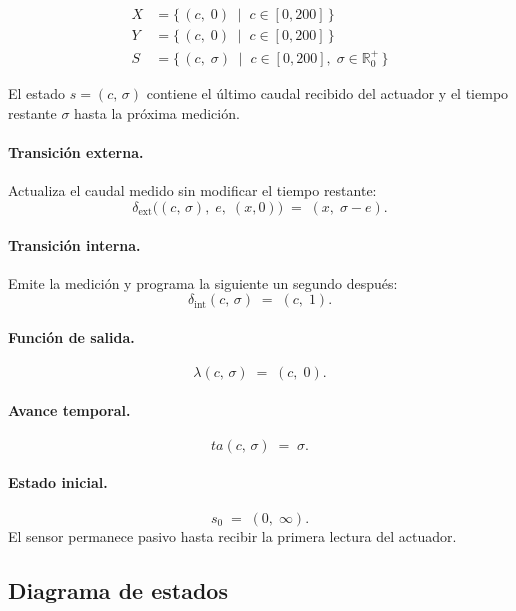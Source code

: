 \documentclass{article}
\newcommand{\dint}{\delta_{\mathrm{int}}}
\newcommand{\dext}{\delta_{\mathrm{ext}}}
\newcommand{\ta}{\mathit{ta}}
\begin{document}
\begin{align*}
  X &= \{\,(c,\;0)\;\mid\; c\in[0,200]\,\} \\[4pt]
  Y &= \{\,(c,\;0)\;\mid\; c\in[0,200]\,\} \\[4pt]
  S &= \{\,(c,\;\sigma)\;\mid\; c\in[0,200],\;\sigma\in\mathbb{R}_0^{+}\,\}
\end{align*}

El estado $s = (c,\,\sigma)$ contiene el último caudal recibido del
actuador y el tiempo restante $\sigma$ hasta la próxima medición.

\paragraph{Transición externa.}
Actualiza el caudal medido sin modificar el tiempo restante:
\[
  \dext\bigl((c,\,\sigma),\;e,\;(x,0)\bigr)
  \;=\; (x,\;\sigma - e).
\]

\paragraph{Transición interna.}
Emite la medición y programa la siguiente un segundo después:
\[
  \dint(c,\,\sigma) \;=\; (c,\;1).
\]

\paragraph{Función de salida.}
\[
  \lambda(c,\,\sigma) \;=\; (c,\;0).
\]

\paragraph{Avance temporal.}
\[
  \ta(c,\,\sigma) \;=\; \sigma.
\]

\paragraph{Estado inicial.}
\[
  s_0 \;=\; (0,\;\infty).
\]
El sensor permanece pasivo hasta recibir la primera lectura del actuador.

\subsection{Diagrama de estados}
\end{document}
